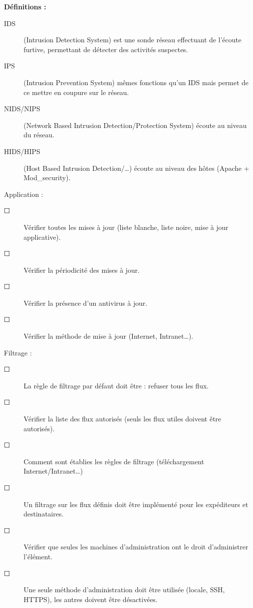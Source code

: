\documentclass[a4paper,11pt]{article}				    %
\begin{document}
{
\textbf{D\'efinitions :} 
\begin{description}
	\item[IDS] (Intrusion Detection System) est une sonde r\'eseau effectuant de l'\'ecoute furtive, permettant de d\'etecter des activit\'es suspectes.
	\item[IPS] (Intrusion Prevention System) m\^emes fonctions qu'un IDS mais permet de ce mettre en coupure sur le r\'eseau.
	\item[NIDS/NIPS] (Network Based Intrusion Detection/Protection System) \'ecoute au niveau du r\'eseau.
	\item[HIDS/HIPS] (Host Based Intrusion Detection/\dots{}) \'ecoute au niveau des h\^otes (Apache + Mod\_security).\\
\end{description}

\begin{LARGE}Application : \end{LARGE}
\begin{description}
    \item[$\Square$] V\'erifier toutes les mises \`a jour (liste blanche, liste noire, mise \`a jour applicative).
    \item[$\Square$] V\'erifier la p\'eriodicit\'e des mises \`a jour.
    \item[$\Square$] V\'erifier la pr\'esence d'un antivirus \`a jour.
    \item[$\Square$] V\'erifier la m\'ethode de mise \`a jour (Internet, Intranet\dots{}).\\
\end{description}

\begin{LARGE}Filtrage : \end{LARGE}
\begin{description}
    \item[$\Square$] La r\`egle de filtrage par d\'efaut doit \^etre : refuser tous les flux.
    \item[$\Square$] V\'erifier la liste des flux autoris\'es (seuls les flux utiles doivent \^etre autoris\'es).
	 \item[$\Square$] Comment sont \'etablies les r\`egles de filtrage (t\'el\'echargement Internet/Intranet\dots{})
    \item[$\Square$] Un filtrage sur les flux d\'efinis doit \^etre impl\'ement\'e pour les exp\'editeurs et destinataires.
    \item[$\Square$] V\'erifier que seules les machines d'administration ont le droit d'administrer l'\'el\'ement.
    \item[$\Square$] Une seule m\'ethode d'administration doit \^etre utilis\'ee (locale, SSH, HTTPS), les autres doivent \^etre d\'esactiv\'ees.\\
\end{description}

}
\end{document}
